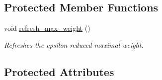 \subsection*{Protected Member Functions}
\begin{DoxyCompactItemize}
\item 
\hypertarget{a00369_aa7077869d24f6570108c2b4236096375}{}void \hyperlink{a00369_aa7077869d24f6570108c2b4236096375}{refresh\+\_\+max\+\_\+weight} ()\label{a00369_aa7077869d24f6570108c2b4236096375}

\begin{DoxyCompactList}\small\item\em Refreshes the epsilon-\/reduced maximal weight. \end{DoxyCompactList}\end{DoxyCompactItemize}
\subsection*{Protected Attributes}
